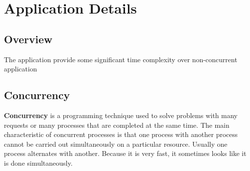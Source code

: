 \documentclass[a4paper,12pt]{report}
\begin{document}
\chapter{Application Details}
\label{sec:org34b1906}

\section{Overview}
\label{sec:orga7dde44}

The application provide some significant time complexity over non-concurrent application

\section{Concurrency}
\label{sec:org0adde85}

\textbf{Concurrency} is a programming technique used to solve problems with many requests or many processes that are completed at the same time. The main characteristic of concurrent processes is that one process with another process cannot be carried out simultaneously on a particular resource. Usually one process alternates with another. Because it is very fast, it sometimes looks like it is done simultaneously.
\end{document}
